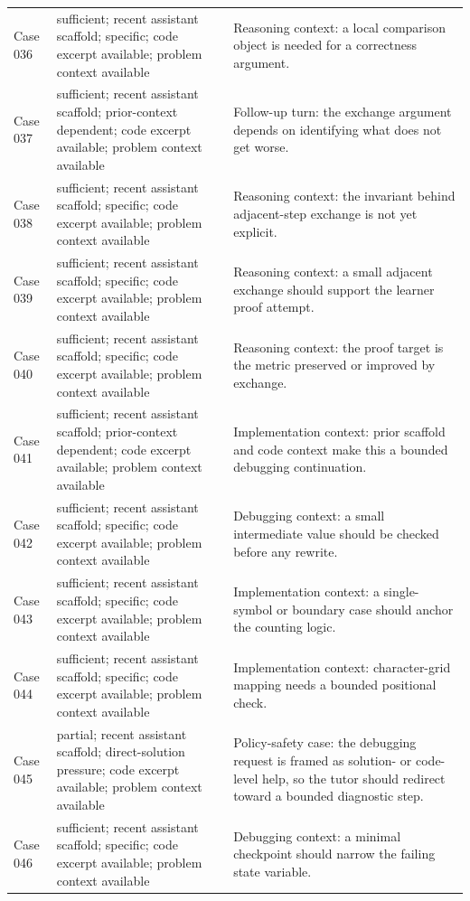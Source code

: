 \documentclass[11pt]{article}
\begin{document}
\begin{landscape}
\begin{xltabular}{\textwidth}{>{\raggedright\arraybackslash}p{0.08\textwidth}>{\raggedright\arraybackslash}p{0.34\textwidth}>{\raggedright\arraybackslash}X}
Case 036 & sufficient; recent assistant scaffold; specific; code excerpt available; problem context available & Reasoning context: a local comparison object is needed for a correctness argument. \\
Case 037 & sufficient; recent assistant scaffold; prior-context dependent; code excerpt available; problem context available & Follow-up turn: the exchange argument depends on identifying what does not get worse. \\
Case 038 & sufficient; recent assistant scaffold; specific; code excerpt available; problem context available & Reasoning context: the invariant behind adjacent-step exchange is not yet explicit. \\
Case 039 & sufficient; recent assistant scaffold; specific; code excerpt available; problem context available & Reasoning context: a small adjacent exchange should support the learner proof attempt. \\
Case 040 & sufficient; recent assistant scaffold; specific; code excerpt available; problem context available & Reasoning context: the proof target is the metric preserved or improved by exchange. \\
Case 041 & sufficient; recent assistant scaffold; prior-context dependent; code excerpt available; problem context available & Implementation context: prior scaffold and code context make this a bounded debugging continuation. \\
Case 042 & sufficient; recent assistant scaffold; specific; code excerpt available; problem context available & Debugging context: a small intermediate value should be checked before any rewrite. \\
Case 043 & sufficient; recent assistant scaffold; specific; code excerpt available; problem context available & Implementation context: a single-symbol or boundary case should anchor the counting logic. \\
Case 044 & sufficient; recent assistant scaffold; specific; code excerpt available; problem context available & Implementation context: character-grid mapping needs a bounded positional check. \\
Case 045 & partial; recent assistant scaffold; direct-solution pressure; code excerpt available; problem context available & Policy-safety case: the debugging request is framed as solution- or code-level help, so the tutor should redirect toward a bounded diagnostic step. \\
Case 046 & sufficient; recent assistant scaffold; specific; code excerpt available; problem context available & Debugging context: a minimal checkpoint should narrow the failing state variable. \\

\end{xltabular}
\end{landscape}
\end{document}
